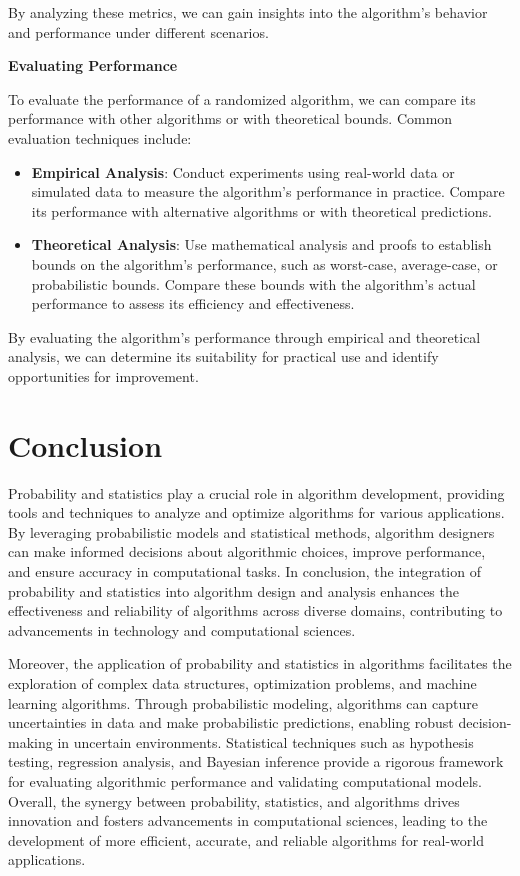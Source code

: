 \documentclass[12pt]{book} %
\begin{document}
By analyzing these metrics, we can gain insights into the algorithm's behavior and performance under different scenarios.

\textbf{Evaluating Performance}

To evaluate the performance of a randomized algorithm, we can compare its performance with other algorithms or with theoretical bounds. Common evaluation techniques include:

\begin{itemize}
    \item \textbf{Empirical Analysis}: Conduct experiments using real-world data or simulated data to measure the algorithm's performance in practice. Compare its performance with alternative algorithms or with theoretical predictions.
    
    \item \textbf{Theoretical Analysis}: Use mathematical analysis and proofs to establish bounds on the algorithm's performance, such as worst-case, average-case, or probabilistic bounds. Compare these bounds with the algorithm's actual performance to assess its efficiency and effectiveness.
\end{itemize}

By evaluating the algorithm's performance through empirical and theoretical analysis, we can determine its suitability for practical use and identify opportunities for improvement.


\section{Conclusion}
Probability and statistics play a crucial role in algorithm development, providing tools and techniques to analyze and optimize algorithms for various applications. By leveraging probabilistic models and statistical methods, algorithm designers can make informed decisions about algorithmic choices, improve performance, and ensure accuracy in computational tasks. In conclusion, the integration of probability and statistics into algorithm design and analysis enhances the effectiveness and reliability of algorithms across diverse domains, contributing to advancements in technology and computational sciences.

Moreover, the application of probability and statistics in algorithms facilitates the exploration of complex data structures, optimization problems, and machine learning algorithms. Through probabilistic modeling, algorithms can capture uncertainties in data and make probabilistic predictions, enabling robust decision-making in uncertain environments. Statistical techniques such as hypothesis testing, regression analysis, and Bayesian inference provide a rigorous framework for evaluating algorithmic performance and validating computational models. Overall, the synergy between probability, statistics, and algorithms drives innovation and fosters advancements in computational sciences, leading to the development of more efficient, accurate, and reliable algorithms for real-world applications.
\end{document}
